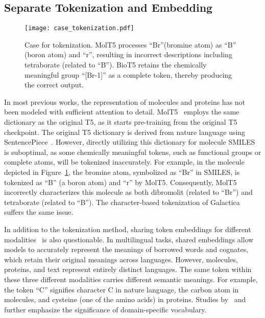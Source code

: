 \documentclass[11pt]{article}
\newcommand{\method}{{BioT5}}
\begin{document}
\subsection{Separate Tokenization and Embedding}
\label{sec:sep_token_emb}
\begin{figure}[t]
    \centering
    \texttt{[image: case\_tokenization.pdf]}
    \caption{Case for tokenization. MolT5 processes ``Br''(bromine atom) as ``B'' (boron atom) and ``r'', resulting in incorrect descriptions including tetraborate (related to ``B''). \method{} retains the chemically meaningful group ``[Br-1]'' as a complete token, thereby producing the correct output.}
    \label{fig:case_tokenization}
\end{figure}
In most previous works, the representation of molecules and proteins has not been modeled with sufficient attention to detail.
MolT5~\citep{DBLP:conf/emnlp/EdwardsLRHCJ22} employs the same dictionary as the original T5, as it starts pre-training from the original T5 checkpoint.
The original T5 dictionary is derived from nature language using SentencePiece~\citep{DBLP:conf/emnlp/KudoR18}.
However, directly utilizing this dictionary for molecule SMILES is suboptimal, as some chemically meaningful tokens, such as functional groups or complete atoms, will be tokenized inaccurately.
For example, in the molecule depicted in Figure~\ref{fig:case_tokenization}, the bromine atom, symbolized as ``Br'' in SMILES, is tokenized as ``B'' (a boron atom) and ``r'' by MolT5.
Consequently, MolT5 incorrectly characterizes this molecule as both dibromolit (related to ``Br'') and tetraborate (related to ``B'').
The character-based tokenization of Galactica~\citep{taylor2022galactica} suffers the same issue.

In addition to the tokenization method, sharing token embeddings for different modalities~\cite{DBLP:conf/emnlp/EdwardsLRHCJ22,taylor2022galactica} is also questionable.
In multilingual tasks, shared embeddings allow models to accurately represent the meanings of borrowed words and cognates, which retain their original meanings across languages.
However, molecules, proteins, and text represent entirely distinct languages.
The same token within these three different modalities carries different semantic meanings.
For example, the token ``C'' signifies character C in nature language, the carbon atom in molecules, and cysteine (one of the  amino acids) in proteins. 
Studies by~\citet{DBLP:conf/emnlp/BeltagyLC19} and~\citet{gu2021domain} further emphasize the significance of domain-specific vocabulary.
\end{document}
